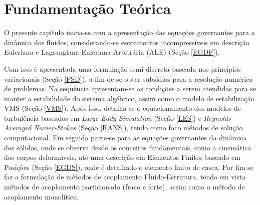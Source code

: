 \chapter{Fundamentação Teórica} \label{FT}

O presente capítulo inicia-se com a apresentação das equações governantes para a dinâmica dos fluidos, considerando-se escoamentos incompressíveis em descrição Euleriana e Lagrangiana-Euleriana Arbitrária (ALE) (Seção \ref{EGDF}). 

Com isso é apresentada uma formulação semi-discreta baseada nos princípios variacionais (Seção \ref{FSD}), a fim de se obter subsídios para a resolução numérica de problemas. Na sequência apresentam-se as condições a serem atendidas para se manter a estabilidade do sistema algébrico, assim como o modelo de estabilização VMS (Seção \ref{VMS}). Após isso, detalha-se o equacionamento dos modelos de turbulência baseados em \textit{Large Eddy Simulation} (Seção \ref{LES}) e \textit{Reynolds-Averaged Navier-Stokes} (Seção \ref{RANS}), tendo como foco métodos de solução computacional. Em seguida parte-se para as equações governantes da dinâmica dos sólidos, onde se observa desde os conceitos fundamentais, como a cinemática dos corpos deformáveis, até uma descrição em Elementos Finitos baseado em Posições (Seção \ref{EGDS}), onde é detalhado o elemento finito de casca. Por fim se faz a formulação de métodos de acoplamento Fluido-Estrutura, tendo em vista métodos de acoplamento particionado (fraco e forte), assim como o método de acoplamento monolítico.

%



%